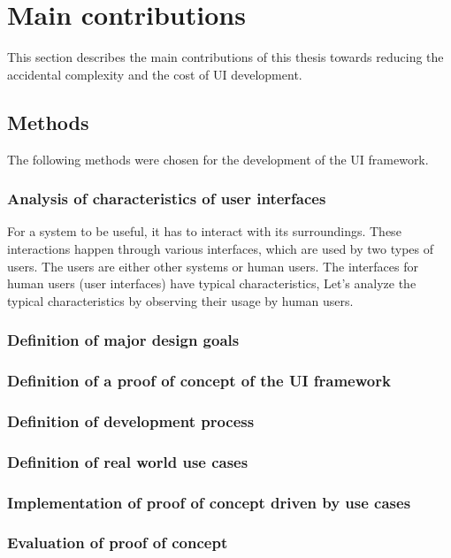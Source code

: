 \section{Main contributions}\label{contributions}
This section describes the main contributions of this thesis towards reducing the accidental complexity and the cost of UI development.

\subsection{Methods}\label{usecases}
The following methods were chosen for the development of the UI framework.

\subsubsection{Analysis of characteristics of user interfaces}
For a system to be useful, it has to interact with its surroundings. These interactions happen through various interfaces, which are used by two types of users. The users are either other systems or human users.
The interfaces for human users (user interfaces) have typical characteristics,
Let's analyze the typical characteristics by observing their usage by human users.

\subsubsection{Definition of major design goals}
\subsubsection{Definition of a proof of concept of the UI framework}
\subsubsection{Definition of development process}
\subsubsection{Definition of real world use cases}
\subsubsection{Implementation of proof of concept driven by use cases}
\subsubsection{Evaluation of proof of concept}
